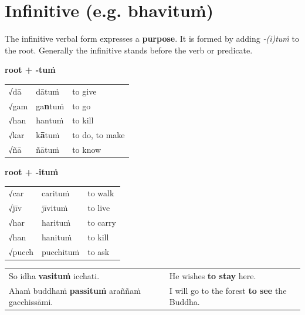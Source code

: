 \documentclass[11pt,oneside]{memoir}
\begin{document}
\clearpage

\section{Infinitive (e.g. bhavituṁ)}
\label{sec:org3d900b2}

The infinitive verbal form expresses a \textbf{purpose}.
It is formed by adding \emph{-(i)tuṁ} to the root.
Generally the infinitive stands before the verb or predicate.

\begin{multicols}{2}

\textbf{root + -tuṁ}

\begin{center}
\begin{tabular}{lll}
√dā & dātuṁ & to give\\[0pt]
√gam & ga\textbf{n}tuṁ & to go\\[0pt]
√han & hantuṁ & to kill\\[0pt]
√kar & k\textbf{ā}tuṁ & to do, to make\\[0pt]
√ñā & ñātuṁ & to know\\[0pt]
\end{tabular}
\end{center}

\columnbreak

\textbf{root + -ituṁ}

\begin{center}
\begin{tabular}{lll}
√car & carituṁ & to walk\\[0pt]
√jīv & jīvituṁ & to live\\[0pt]
√har & harituṁ & to carry\\[0pt]
√han & hanituṁ & to kill\\[0pt]
√pucch & pucchituṁ & to ask\\[0pt]
\end{tabular}
\end{center}

\end{multicols}

\begin{center}
\begin{tabular}{ll}
So idha \textbf{vasituṁ} icchati. & He wishes \textbf{to stay} here.\\[0pt]
Ahaṁ buddhaṁ \textbf{passituṁ} araññaṁ gacchissāmi. & I will go to the forest \textbf{to see} the Buddha.\\[0pt]
\end{tabular}
\end{center}
\end{document}
